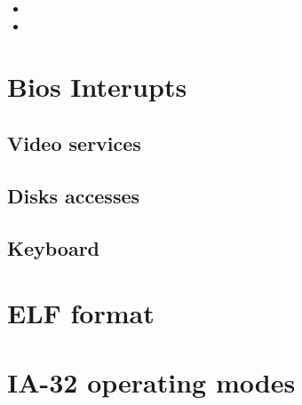   \begin{itemize}
  \item {\tt }
  \item {\tt }
  \end{itemize}

\newpage


%
%

\section{Bios Interupts}

\subsection{Video services}





\subsection{Disks accesses}





\subsection{Keyboard}





%
%

\section{ELF format}









%
%

\section{IA-32 operating modes}




